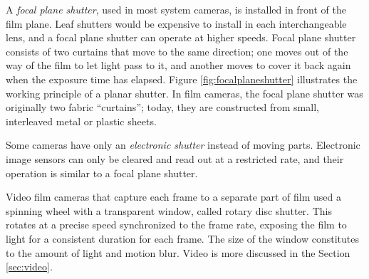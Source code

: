A \emph{focal plane shutter}, used in most system cameras, is installed in front of the film plane.
Leaf shutters would be expensive to install in each interchangeable lens, and a focal plane shutter can operate at higher speeds.
Focal plane shutter consists of two curtains that move to the same direction; one moves out of the way of the film to let light pass to it, and another moves to cover it back again when the exposure time has elapsed.
\cite{greenleaf1950photographic}
Figure \ref{fig:focalplaneshutter} illustrates the working principle of a planar shutter.
In film cameras, the focal plane shutter was originally two fabric ``curtains'';
today, they are constructed from small, interleaved metal or plastic sheets.

Some cameras have only an \emph{electronic shutter} instead of moving parts.
Electronic image sensors can only be cleared and read out at a restricted rate, and their operation is similar to a focal plane shutter.
\cite{caspeelectronic,kodakshutter}

Video film cameras that capture each frame to a separate part of film used a spinning wheel with a transparent window, called rotary disc shutter. \cite{wilson2004anton}
This rotates at a precise speed synchronized to the frame rate, exposing the film to light for a consistent duration for each frame.
The size of the window constitutes to the amount of light and motion blur.
Video is more discussed in the Section \ref{sec:video}.


